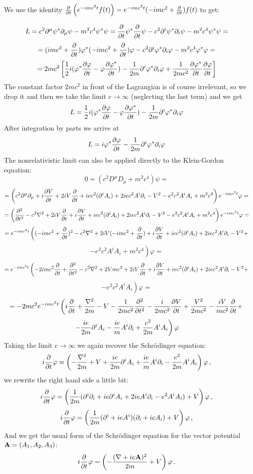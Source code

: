 We use the identity
${\partial\over\partial t}\left(e^{-imc^2t}f(t)\right)=
e^{-imc^2t}(-imc^2+{\partial\over\partial t})f(t)$ to get:

$$L=c^2\partial^\mu\psi^*\partial_\mu\psi-m^2c^4\psi^*\psi=
{\partial\over\partial t}\psi^*{\partial\over\partial t}\psi
-c^2\partial^i\psi^*\partial_i\psi-m^2c^4\psi^*\psi=$$
$$=(imc^2+{\partial\over\partial t})\varphi^*
(-imc^2+{\partial\over\partial t})\varphi
-c^2\partial^i\varphi^*\partial_i\varphi-m^2c^4\varphi^*\varphi=$$
$$=2mc^2\left[{1\over2}i(\varphi^*{\partial\varphi\over\partial t}-
\varphi{\partial\varphi^*\over\partial t})-
{1\over2m}\partial^i\varphi^*\partial_i\varphi
+{1\over2mc^2}{\partial\varphi^*\over\partial t}
{\partial\varphi\over\partial t}\right]$$
The constant factor $2mc^2$ in front of the Lagrangian is of course irrelevant,
so we drop it and then we take the limit $c\to\infty$ (neglecting the last
term) and we get
$$L={1\over2}i(\varphi^*{\partial\varphi\over\partial t}-
\varphi{\partial\varphi^*\over\partial t})-
{1\over2m}\partial^i\varphi^*\partial_i\varphi
$$
After integration by parts we arrive at
$$L=i\varphi^*{\partial\varphi\over\partial t}
-{1\over 2m}\partial^i\varphi^*\partial_i
\varphi$$
The nonrelativistic limit can also be applied directly to the Klein-Gordon equation:
$$0=(c^2D^\mu D_\mu+m^2c^4)\psi=$$
$$=\left(
c^2\partial^\mu\partial_\mu
+i{\partial V\over\partial t}
+2iV{\partial\over\partial t}
+iec^2(\partial^i A_i)
+2iec^2A^i\partial_i
-V^2
-e^2c^2A^iA_i
+m^2c^4
\right)e^{-imc^2t}\varphi=
$$
$$=\left(
{\partial^2\over\partial t^2}
-c^2\nabla^2
+2iV{\partial\over\partial t}
+i{\partial V\over\partial t}
+iec^2(\partial^i A_i)
+2iec^2A^i\partial_i
-V^2
-e^2c^2A^iA_i
+m^2c^4
\right)e^{-imc^2t}\varphi=
$$
$$=e^{-imc^2t}\left(
(-imc^2+{\partial\over\partial t})^2
-c^2\nabla^2
+2iV(-imc^2+{\partial\over\partial t})
+i{\partial V\over\partial t}
+iec^2(\partial^i A_i)
+2iec^2A^i\partial_i
-V^2+ \right.
$$
$$\left.
-e^2c^2A^iA_i
+m^2c^4
\right)\varphi=
$$
$$=e^{-imc^2t}\left(
-2imc^2{\partial\over\partial t}+{\partial^2\over\partial t^2}
-c^2\nabla^2
+2Vmc^2
+2iV{\partial\over\partial t}
+i{\partial V\over\partial t}
+iec^2(\partial^i A_i)
+2iec^2A^i\partial_i
-V^2+ \right.
$$
$$\left.
-e^2c^2A^iA_i
\right)\varphi=
$$
$$=
-2mc^2 e^{-imc^2 t} \left(i{\partial\over\partial t}+{\nabla^2\over2m}-V
-{1\over2mc^2}{\partial^2\over\partial t^2}-{i\over2mc^2}{\partial
V\over\partial t}+{V^2\over2mc^2}-{iV\over mc^2}{\partial\over\partial
t}+\right.$$
$$\left.-{ie\over2m}\partial^i A_i-{ie\over
m}A^i\partial_i+{e^2\over2m}A^iA_i\right)\varphi
$$
Taking the limit $c\to\infty$ we again recover the Schr\"odinger equation:
$$i{\partial\over\partial t}\varphi=\left(-{\nabla^2\over2
m}+V
+{ie\over2m}\partial^i A_i
+{ie\over m}A^i\partial_i
-{e^2\over2m}A^iA_i
\right)\varphi\,,$$
we rewrite the right hand side a little bit:
$$i{\partial\over\partial t}\varphi=\left({1\over2 m}
(\partial^i\partial_i
+ie\partial^i A_i
+2ieA^i\partial_i
-e^2A^iA_i
)
+V
\right)\varphi\,,$$
$$i{\partial\over\partial t}\varphi=\left({1\over2 m}
(\partial^i+ieA^i)(\partial_i+ieA_i)
+V
\right)\varphi\,,$$
And we get the usual form of the Schr\"odinger equation for the vector
potential ${\bf A}=(A_1, A_2, A_3)$:
$$i{\partial\over\partial t}\varphi=\left(-{(\nabla+ie{\bf A})^2\over2 m}
+V \right)\varphi\,.$$
